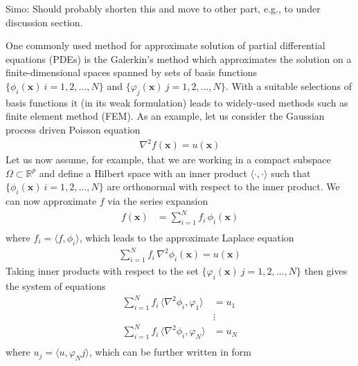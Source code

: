 \documentclass[journal]{IEEEtran}
\newcommand{\simo}[1]{{\color{red}#1}}
\begin{document}
\simo{Simo: Should probably shorten this and move to other part, e.g., to under discussion section.}

One commonly used method for approximate solution of partial differential equations (PDEs) is the Galerkin's method which approximates the solution on a finite-dimensional spaces spanned by sets of basis functions $\{ \phi_i(\mathbf{x})~i=1,2,\ldots,N \}$ and $\{ \varphi_j(\mathbf{x})~j=1,2,\ldots,N \}$. With a suitable selections of basis functions it (in its weak formulation) leads to widely-used methods such as finite element method (FEM). As an example, let us consider the Gaussian process driven Poisson equation
%
\begin{equation}
\begin{split}
  \nabla^2 f(\mathbf{x}) = u(\mathbf{x})
\end{split}
\end{equation}
%
Let us now assume, for example, that we are working in a compact subspace $\Omega \subset \mathbb{R}^p$ and define a Hilbert space with an inner product $\langle \cdot, \cdot \rangle$ such that $\{ \phi_i(\mathbf{x})~i=1,2,\ldots,N \}$ are orthonormal with respect to the inner product. We can now approximate $f$ via the series expansion
%
\begin{equation}
\begin{split}
   f(\mathbf{x}) &= \sum_{i=1}^N f_i \, \phi_i(\mathbf{x}) \\
\end{split}
\end{equation}
%
where $f_i = \langle f, \phi_i \rangle$, which leads to the approximate Laplace equation
%
\begin{equation}
\begin{split}
  \sum_{i=1}^N f_i \, \nabla^2 \phi_i(\mathbf{x}) = u(\mathbf{x})
\end{split}
\end{equation}
%
Taking inner products with respect to the set $\{ \varphi_i(\mathbf{x})~j=1,2,\ldots,N \}$ then gives the system of equations
%
\begin{equation}
\begin{split}
  \sum_{i=1}^N f_i \, \langle \nabla^2 \phi_i, \varphi_1 \rangle &= u_1 \\
  &\vdots \\
  \sum_{i=1}^N f_i \, \langle \nabla^2 \phi_i, \varphi_N \rangle &= u_N \\
\end{split}
\end{equation}
%
where $u_j = \langle u, \varphi_Nj\rangle$, which can be further written in form
\end{document}
